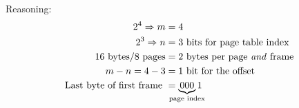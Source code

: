 \documentclass[a4paper]{article}
\begin{document}
\begin{multicols*}{2}
    Reasoning:
    \vspace*{-2em}
    \begin{align*}
        2^4 \Rightarrow m                  & = 4                                                \\
        2^3 \Rightarrow n                  & = 3 \text{ bits for page table index}              \\
        16 \text{ bytes} / 8 \text{ pages} & = 2 \text{ bytes per page \emph{and} frame}        \\
        m - n = 4 - 3                      & = 1 \text{ bit}       \text{ for the offset}       \\
        \text{Last byte of first frame }   & = \underbrace{000}_{\mathclap{\text{page index}}}1
    \end{align*}
\end{multicols*}
\end{document}
